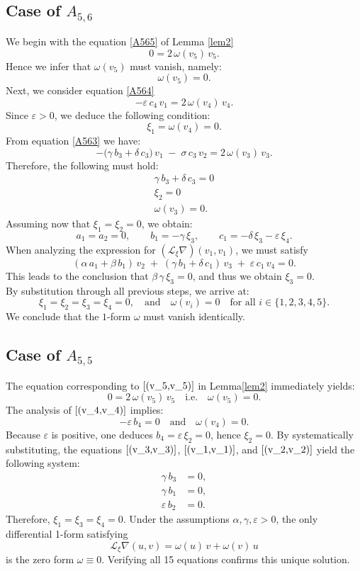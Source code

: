 \documentclass[10pt]{article}
\begin{document}
\subsection{Case of $A_{5,6}$}
We begin with the equation \eqref{A565} of Lemma  \ref{lem2}
\[
0 = 2\,\omega(v_5)\,v_5.
\]
Hence we infer that \(\omega(v_5)\) must vanish, namely:
\[
\omega(v_5) = 0.
\]
Next, we consider equation \eqref{A564}
\[
-\varepsilon\,c_4\,v_1 = 2\,\omega(v_4)\,v_4.
\]
Since $\varepsilon>0$, we deduce the following condition:
\[\xi_1 = \omega(v_4) = 0.
\]
From equation \eqref{A563} we have:
\[
-\bigl(\gamma\,b_3 + \delta\,c_3\bigr)\,v_1 \;-\; \sigma\,c_3\,v_2 = 2\,\omega(v_3)\,v_3.
\]
Therefore, the following must hold:
$$\begin{aligned}
\gamma\,b_3 + \delta\,c_3 = 0\\
\xi_2 = 0\\
\omega(v_3) = 0.
\end{aligned}$$
Assuming now that \(\xi_1 = \xi_2 = 0\), we obtain:
\[
a_1 = a_2 = 0,\qquad b_1 = -\gamma\,\xi_3,\qquad c_1 = -\delta\,\xi_3 - \varepsilon\,\xi_4.
\]
When analyzing the expression for \((\mathscr{L}_\xi\nabla)(v_1, v_1)\), we must satisfy
\[
(\alpha\,a_1 + \beta\,b_1)\,v_2 \;+\; (\gamma\,b_1 + \delta\,c_1)\,v_3 \;+\; \varepsilon\,c_1\,v_4 = 0.
\]
This leads to the conclusion that \(\beta\,\gamma\,\xi_3 = 0\), and thus we obtain \(\xi_3 = 0\).\\
By substitution through all previous steps, we arrive at:
\[
\xi_1 = \xi_2 = \xi_3 =  \xi_4 = 0, \quad
\text{and}\quad \omega(v_i) = 0 \quad \text{for all } i \in \{1,2,3,4,5\}.
\]
We conclude that the $1$-form \(\omega\) must vanish identically.
\subsection{Case of $A_{5,5}$}
The equation corresponding to \(\eqref{(v_5,v_5)}\) in Lemma\ref{lem2} immediately yields:
\[
0 = 2\,\omega(v_5)\,v_5
\quad\mathrm{i.e.}\quad
\omega(v_5) = 0.
\]
The analysis of \(\eqref{(v_4,v_4)}\) implies:
\[
-\varepsilon\,b_4 = 0
\quad\text{and}\quad
\omega(v_4) = 0.
\]
Because \(\varepsilon\) is positive, one deduces \(b_4 = \varepsilon\,\xi_2 = 0\), hence \(\xi_2 = 0\).
By systematically substituting, the equations \(\eqref{(v_3,v_3)}\), \(\eqref{(v_1,v_1)}\), and \(\eqref{(v_2,v_2)}\) yield the following system:
\begin{align*}
\gamma\,b_3 &= 0,\\
\gamma\,b_1 &= 0,\\
\varepsilon\,b_2 &= 0.
\end{align*}
Therefore, \(\xi_1 = \xi_3 = \xi_4 = 0\). Under the assumptions \(\alpha, \gamma, \varepsilon > 0\), the only differential 1-form satisfying
\[
\mathscr{L}_\xi\nabla(u, v) = \omega(u)\,v + \omega(v)\,u
\]
is the zero form \(\omega \equiv 0\). Verifying all 15 equations confirms this unique solution.
\end{document}
